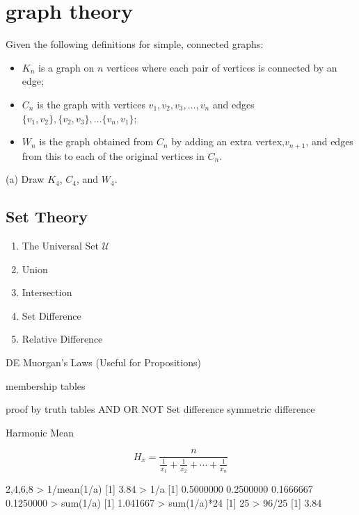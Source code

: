 \documentclass[]{report}
\begin{document}
\chapter{graph theory }
Given the following definitions for simple, connected graphs:
\begin{itemize}
\item $K_n$ is a graph on $n$ vertices where each pair of vertices is connected by an edge;
\item $C_n$ is the graph with vertices $v_1, v_2, v_3, \dots, v_n$ and edges $\{v_1,v_2\}, \{v_2,v_3\}, \dots\{v_n, v_1\}$;
\item $W_n$ is the graph obtained from $C_n$ by adding an extra vertex,$v_{n+1}$, and edges
from this to each of the original vertices in $C_n$.
\end{itemize}
(a) Draw $K_4$, $C_4$, and $W_4$. 


\section{Set Theory}
\begin{enumerate}
\item The Universal Set $\mathcal{U}$
\item Union
\item Intersection
\item Set Difference
\item Relative Difference
\end{enumerate}



DE Muorgan's Laws (Useful for Propositions)

membership tables

proof by truth tables
AND
OR
NOT
Set difference
symmetric difference



\newpage


Harmonic Mean

\[ H_x = \frac{ n }{ \frac{ 1 }{ x_1 } + \frac{ 1 }{ x_2 } + \cdots + \frac{ 1 }{ x_n } } \]

2,4,6,8
> 1/mean(1/a)
[1] 3.84
> 1/a
[1] 0.5000000 0.2500000 0.1666667 0.1250000
> sum(1/a)
[1] 1.041667
> sum(1/a)*24
[1] 25
> 96/25
[1] 3.84
\end{document}
